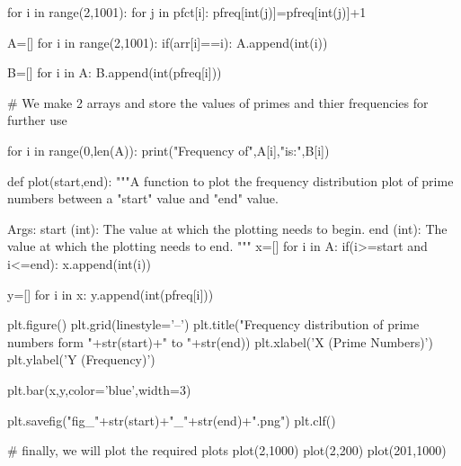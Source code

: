 \documentclass[12pt]{article}
\begin{document}
\begin{python}
for i in range(2,1001):
    for j in pfct[i]:
        pfreq[int(j)]=pfreq[int(j)]+1

A=[]
for i in range(2,1001):
    if(arr[i]==i):
        A.append(int(i))

B=[]
for i in A:
    B.append(int(pfreq[i]))

# We make 2 arrays and store the values of primes and thier frequencies for further use

for i in range(0,len(A)):
    print("Frequency of",A[i],"is:",B[i])

def plot(start,end):
    """A function to plot the frequency distribution plot of prime numbers between a "start" value and "end" value.

    Args:
        start (int): The value at which the plotting needs to begin.
        end (int): The value at which the plotting needs to end.
    """
    x=[]
    for i in A:
        if(i>=start and i<=end):
            x.append(int(i))
        

    y=[]
    for i in x:
        y.append(int(pfreq[i]))
    
    plt.figure()
    plt.grid(linestyle='--')
    plt.title("Frequency distribution of prime numbers form "+str(start)+" to "+str(end))
    plt.xlabel('X (Prime Numbers)')
    plt.ylabel('Y (Frequency)')

    plt.bar(x,y,color='blue',width=3)

    plt.savefig("fig_"+str(start)+"_"+str(end)+".png")
    plt.clf()

# finally, we will plot the required plots
plot(2,1000)
plot(2,200)
plot(201,1000)



\end{python}
\end{document}

